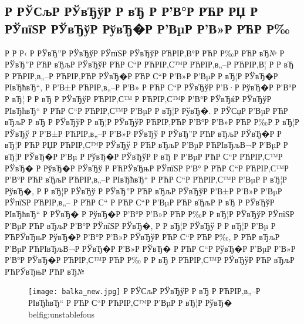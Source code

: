 \documentclass[a4paper,14pt]{extarticle}
\begin{document}
\clearpage
\subsection{Р  РЎСљР  РЎвЂўР  Р вЂ Р  Р’В°Р РЋР РЏ Р  РЎпїЅР  РЎвЂўР  РўвЂ�Р  Р’ВµР  Р’В»Р РЋР Р‰}
	Р  Р Р‹ Р  РЎвЂ”Р  РЎвЂўР  РЎпїЅР  РЎвЂўР РЋРІР‚В°Р РЋР Р‰Р РЋР вЂ№ Р  РЎвЂ”Р РЋР вЂљР  РЎвЂўР РЋР С“Р РЋРІР‚С™Р РЋРІР‚в„–Р РЋРІР‚В¦ Р  Р вЂ Р РЋРІР‚в„–Р РЋРІР‚РЋР  РЎвЂ�Р РЋР С“Р  Р’В»Р  Р’ВµР  Р вЂ¦Р  РЎвЂ�Р  РІвЂћвЂ“, Р  Р’В±Р РЋРІР‚в„–Р  Р’В» Р РЋР С“Р  РЎвЂўР  Р’В·Р  РўвЂ�Р  Р’В°Р  Р вЂ¦ Р  Р вЂ Р  РЎвЂўР РЋРІР‚С™ Р РЋРІР‚С™Р  Р’В°Р  РЎвЂќР  РЎвЂўР  РІвЂћвЂ“ Р РЋР С“Р РЋРІР‚С™Р  Р’ВµР  Р вЂ¦Р  РўвЂ�.  
	Р  РЎСџР  Р’ВµР РЋР вЂљР  Р вЂ Р  РЎвЂўР  Р вЂ¦Р  РЎвЂўР РЋРІР‚РЋР  Р’В°Р  Р’В»Р РЋР Р‰Р  Р вЂ¦Р  РЎвЂў Р  Р’В±Р РЋРІР‚в„–Р  Р’В»Р  РЎвЂў Р  РЎвЂ”Р РЋР вЂљР  РЎвЂ�Р  Р вЂ¦Р РЋР РЏР РЋРІР‚С™Р  РЎвЂў Р РЋР вЂљР  Р’ВµР РЋРІвЂљВ¬Р  Р’ВµР  Р вЂ¦Р  РЎвЂ�Р  Р’Вµ Р  РўвЂ�Р  РЎвЂўР  Р вЂ Р  Р’ВµР РЋР С“Р РЋРІР‚С™Р  РЎвЂ� Р  РўвЂ�Р  РЎвЂў Р РЋРЎвЂњР  РЎпїЅР  Р’В° Р РЋР С“Р РЋРІР‚С™Р  Р’В°Р РЋР вЂљР РЋРІР‚в„–Р  РІвЂћвЂ“ Р РЋР С“Р РЋРІР‚С™Р  Р’ВµР  Р вЂ¦Р  РўвЂ�, Р  Р вЂ¦Р  РЎвЂў Р  РЎвЂ”Р РЋР вЂљР  РЎвЂўР  Р’В±Р  Р’В»Р  Р’ВµР  РЎпїЅР РЋРІР‚в„– Р РЋР С“ Р РЋР С“Р  Р’ВµР РЋР вЂљР  Р вЂ Р  РЎвЂўР  РІвЂћвЂ“ Р  РЎвЂ� Р  РўвЂ�Р  Р’В°Р  Р’В»Р РЋР Р‰Р  Р вЂ¦Р  РЎвЂўР  РЎпїЅР  Р’ВµР РЋР вЂљР  Р’В°Р  РЎпїЅР  РЎвЂ�, Р  Р вЂ¦Р  РЎвЂў Р  Р вЂ¦Р  Р’Вµ Р РЋРЎвЂњР  РўвЂ�Р  Р’В°Р  Р’В»Р  РЎвЂўР РЋР С“Р РЋР Р‰, Р РЋР вЂљР  Р’ВµР РЋРІвЂљВ¬Р  РЎвЂ�Р  Р’В»Р  РЎвЂ� Р РЋР С“Р  РўвЂ�Р  Р’ВµР  Р’В»Р  Р’В°Р  РЎвЂ�Р РЋРІР‚С™Р РЋР Р‰ Р  Р вЂ Р РЋРІР‚С™Р  РЎвЂўР РЋР вЂљР РЋРЎвЂњР РЋР вЂ№

\begin{figure}[H]
  \texttt{[image: balka\_new.jpg]}
  {Р  РЎСљР  РЎвЂўР  Р вЂ Р РЋРІР‚в„–Р  РІвЂћвЂ“ Р РЋР С“Р РЋРІР‚С™Р  Р’ВµР  Р вЂ¦Р  РўвЂ� }
\label{graph_fragment}bel{fig:unstablefous}
\end{figure}
\end{document}
